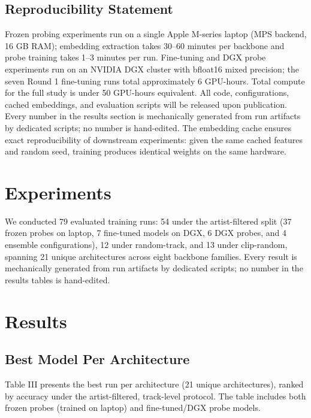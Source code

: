 \documentclass[conference]{IEEEtran}
\begin{document}
\subsection{Reproducibility
Statement}\label{g.-reproducibility-statement}

Frozen probing experiments run on a single Apple M-series laptop (MPS
backend, 16 GB RAM); embedding extraction takes 30--60 minutes per
backbone and probe training takes 1--3 minutes per run. Fine-tuning
and DGX probe experiments run on an NVIDIA DGX cluster with bfloat16
mixed precision; the seven Round 1 fine-tuning runs total approximately
6 GPU-hours. Total compute for the full study is under 50 GPU-hours
equivalent. All code, configurations, cached embeddings, and evaluation
scripts will be released upon publication. Every number in the results
section is mechanically generated from run artifacts by dedicated
scripts; no number is hand-edited. The embedding cache ensures exact
reproducibility of downstream experiments: given the same cached
features and random seed, training produces identical weights on the
same hardware.

\section{Experiments}\label{experiments}

We conducted 79 evaluated training runs: 54 under the artist-filtered
split (37 frozen probes on laptop, 7 fine-tuned models on DGX, 6 DGX
probes, and 4 ensemble configurations), 12 under random-track, and 13
under clip-random, spanning 21 unique architectures across eight
backbone families. Every result is mechanically generated from run
artifacts by dedicated scripts; no number in the results tables is
hand-edited.

\section{Results}\label{results}

\subsection{Best Model Per
Architecture}\label{a.-best-model-per-architecture}

Table III presents the best run per architecture (21 unique
architectures), ranked by accuracy under the artist-filtered,
track-level protocol. The table includes both frozen probes (trained on
laptop) and fine-tuned/DGX probe models.
\end{document}
